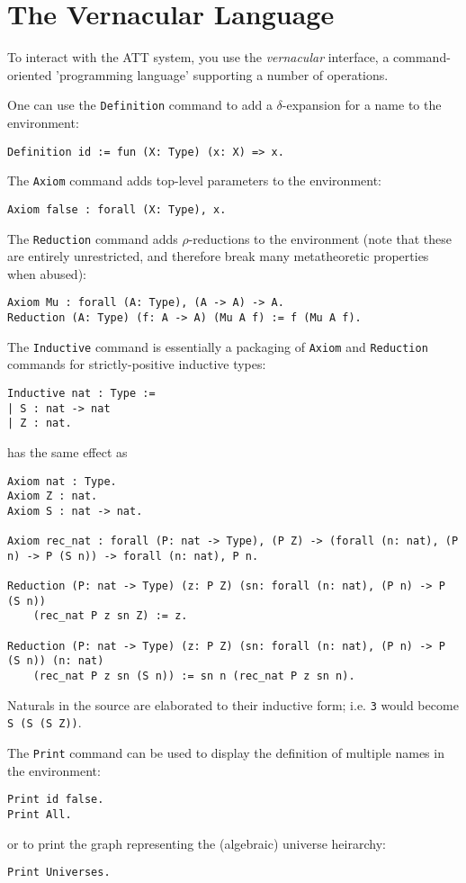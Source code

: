 \documentclass{article}
\begin{document}
\section{The Vernacular Language}

To interact with the ATT system, you use the \emph{vernacular} interface, a command-oriented 'programming language' supporting a number of operations.

One can use the \texttt{Definition} command to add a $\delta$-expansion for a name to the environment:
\begin{lstlisting}
Definition id := fun (X: Type) (x: X) => x.
\end{lstlisting}

The \texttt{Axiom} command adds top-level parameters to the environment:
\begin{lstlisting}
Axiom false : forall (X: Type), x.
\end{lstlisting}

The \texttt{Reduction} command adds $\rho$-reductions to the environment (note that these are entirely unrestricted, and therefore break many metatheoretic properties when abused):
\begin{lstlisting}
Axiom Mu : forall (A: Type), (A -> A) -> A.
Reduction (A: Type) (f: A -> A) (Mu A f) := f (Mu A f).
\end{lstlisting}

The \texttt{Inductive} command is essentially a packaging of \texttt{Axiom} and \texttt{Reduction} commands for strictly-positive inductive types:
\begin{lstlisting}
Inductive nat : Type :=
| S : nat -> nat
| Z : nat.
\end{lstlisting}
has the same effect as
\begin{lstlisting}
Axiom nat : Type.
Axiom Z : nat.
Axiom S : nat -> nat.

Axiom rec_nat : forall (P: nat -> Type), (P Z) -> (forall (n: nat), (P n) -> P (S n)) -> forall (n: nat), P n.

Reduction (P: nat -> Type) (z: P Z) (sn: forall (n: nat), (P n) -> P (S n))
    (rec_nat P z sn Z) := z.

Reduction (P: nat -> Type) (z: P Z) (sn: forall (n: nat), (P n) -> P (S n)) (n: nat)
    (rec_nat P z sn (S n)) := sn n (rec_nat P z sn n).
\end{lstlisting}
Naturals in the source are elaborated to their inductive form; i.e. \texttt{3} would become \texttt{S (S (S Z))}.

The \texttt{Print} command can be used to display the definition of multiple names in the environment:
\begin{lstlisting}
Print id false.
Print All.
\end{lstlisting}
or to print the graph representing the (algebraic) universe heirarchy:
\begin{lstlisting}
Print Universes.
\end{lstlisting}
\end{document}
